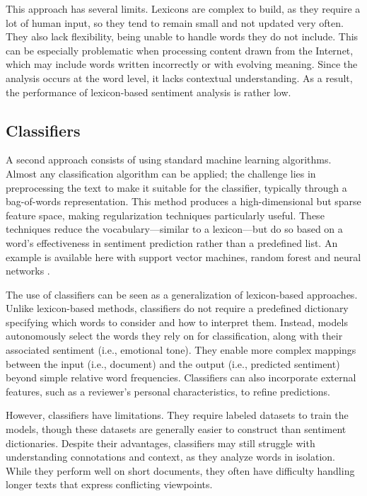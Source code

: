 \documentclass{article}
\begin{document}
This approach has several limits. Lexicons are complex to build, as they require a lot of human input, so they tend to remain small and not updated very often. They also lack flexibility, being unable to handle words they do not include. This can be especially problematic when processing content drawn from the Internet, which may include words written incorrectly or with evolving meaning. Since the analysis occurs at the word level, it lacks contextual understanding. As a result, the performance of lexicon-based sentiment analysis is rather low.

\subsection{Classifiers}

A second approach consists of using standard machine learning algorithms. Almost any classification algorithm can be applied; the challenge lies in preprocessing the text to make it suitable for the classifier, typically through a bag-of-words representation. This method produces a high-dimensional but sparse feature space, making regularization techniques particularly useful. These techniques reduce the vocabulary—similar to a lexicon—but do so based on a word’s effectiveness in sentiment prediction rather than a predefined list. An example is available here with support vector machines, random forest and neural networks \citep{wang_is_2024}.

The use of classifiers can be seen as a generalization of lexicon-based approaches. Unlike lexicon-based methods, classifiers do not require a predefined dictionary specifying which words to consider and how to interpret them. Instead, models autonomously select the words they rely on for classification, along with their associated sentiment (i.e., emotional tone). They enable more complex mappings between the input (i.e., document) and the output (i.e., predicted sentiment) beyond simple relative word frequencies. Classifiers can also incorporate external features, such as a reviewer’s personal characteristics, to refine predictions.

However, classifiers have limitations. They require labeled datasets to train the models, though these datasets are generally easier to construct than sentiment dictionaries. Despite their advantages, classifiers may still struggle with understanding connotations and context, as they analyze words in isolation. While they perform well on short documents, they often have difficulty handling longer texts that express conflicting viewpoints.
\end{document}
